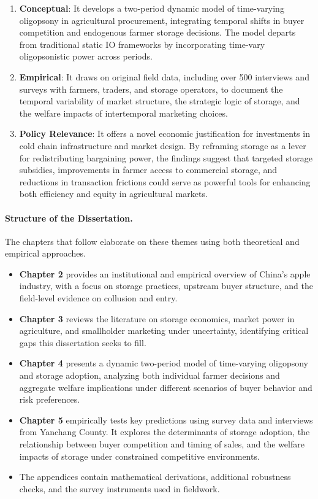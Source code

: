 \begin{enumerate}
    \item \textbf{Conceptual}: It develops a two-period dynamic model of time-varying oligopsony in agricultural procurement, integrating temporal shifts in buyer competition and endogenous farmer storage decisions. The model departs from traditional static IO frameworks by incorporating time-vary oligopsonistic power across periods.

    \item \textbf{Empirical}: It draws on original field data, including over 500 interviews and surveys with farmers, traders, and storage operators, to document the temporal variability of market structure, the strategic logic of storage, and the welfare impacts of intertemporal marketing choices.

    \item \textbf{Policy Relevance}: It offers a novel economic justification for investments in cold chain infrastructure and market design. By reframing storage as a lever for redistributing bargaining power, the findings suggest that targeted storage subsidies, improvements in farmer access to commercial storage, and reductions in transaction frictions could serve as powerful tools for enhancing both efficiency and equity in agricultural markets.
\end{enumerate}


\paragraph{Structure of the Dissertation.}
The chapters that follow elaborate on these themes using both theoretical and empirical approaches.

\begin{itemize}
    \item \textbf{Chapter 2} provides an institutional and empirical overview of China's apple industry, with a focus on storage practices, upstream buyer structure, and the field-level evidence on collusion and entry.

    \item \textbf{Chapter 3} reviews the literature on storage economics, market power in agriculture, and smallholder marketing under uncertainty, identifying critical gaps this dissertation seeks to fill.

    \item \textbf{Chapter 4} presents a dynamic two-period model of time-varying oligopsony and storage adoption, analyzing both individual farmer decisions and aggregate welfare implications under different scenarios of buyer behavior and risk preferences.

    \item \textbf{Chapter 5} empirically tests key predictions using survey data and interviews from Yanchang County. It explores the determinants of storage adoption, the relationship between buyer competition and timing of sales, and the welfare impacts of storage under constrained competitive environments.

    \item The appendices contain mathematical derivations, additional robustness checks, and the survey instruments used in fieldwork.
\end{itemize}
